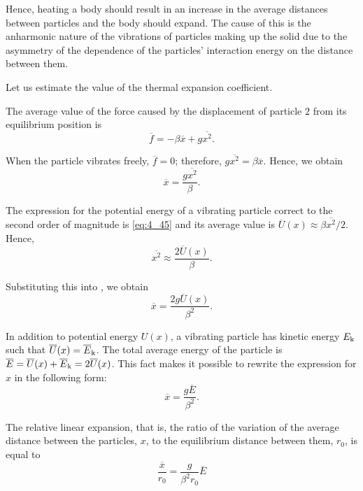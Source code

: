 Hence, heating a body should result in an increase in the average distances between particles and the body should expand. The cause of this is the anharmonic nature of the vibrations of particles making up the solid due to the asymmetry of the dependence of the particles' interaction energy on the distance between them.

Let us estimate the value of the thermal expansion coefficient.

The average value of the force caused by the displacement of particle $2$ from its equilibrium position is
\begin{equation*}
    \overline{f} = -\beta \overline{x} + g \overline{x^2}.
\end{equation*}

\noindent
When the particle vibrates freely, $\overline{f}=0$; therefore, $g\overline{x^2}=\beta\overline{x}$. Hence, we obtain
\begin{equation}\label{eq:4_47}
    \overline{x} = \frac{g\overline{x^2}}{\beta}.
\end{equation}

The expression for the potential energy of a vibrating particle correct to the second order of magnitude is \eqref{eq:4_45} and its average value is $\overline{U}(x)\approx\beta\overline{x^2}/2$. Hence,
\begin{equation*}
    \overline{x^2} \approx \frac{2 \overline{U}(x)}{\beta}.
\end{equation*}

\noindent
Substituting this into , we obtain
\begin{equation*}
    \overline{x} = \frac{2 g \overline{U}(x)}{\beta^2}.
\end{equation*}

In addition to potential energy $U(x)$, a vibrating particle has kinetic energy $E_{\text{k}}$ such that $\overline{U}(x)=\overline{E}_{\text{k}}$. The total average energy of the particle is $\overline{E}=\overline{U}(x)+\overline{E}_{\text{k}}=2\overline{U}(x)$. This fact makes it possible to rewrite the expression for $x$ in the following form:
\begin{equation*}
    \overline{x} = \frac{g \overline{E}}{\beta^2}.
\end{equation*}

\noindent
The relative linear expansion, that is, the ratio of the variation of the average distance between the particles, $x$, to the equilibrium distance between them, $r_0$, is equal to
\begin{equation*}
    \frac{\overline{x}}{r_0} = \frac{g}{\beta^2 r_0} \overline{E}
\end{equation*}

